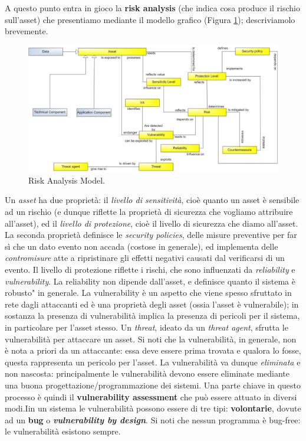 A questo punto entra in gioco la \textbf{risk analysis} (che indica cosa produce il rischio sull'asset) che presentiamo mediante il modello grafico (Figura \ref{img:risk_analysis_model}); descriviamolo brevemente. 
\begin{figure}[htbp]
	\centering
	\includegraphics[scale = 0.4]{images/risk_analysis_model}
	\caption{Risk Analysis Model.}
	\label{img:risk_analysis_model}
\end{figure}

Un \textit{asset} ha due proprietà: il \textit{livello di sensitività}, cioè quanto un asset è sensibile ad un rischio (e dunque riflette la proprietà di sicurezza che vogliamo attribuire all'asset), ed il \textit{livello di protezione}, cioè il livello di sicurezza che diamo all'asset. La seconda proprietà definisce le \textit{security policies}, delle misure preventive per far sì che un dato evento non accada (costose in generale), ed implementa delle \textit{contromisure} atte a ripristinare gli effetti negativi causati dal verificarsi di un evento. Il livello di protezione riflette i rischi, che sono influenzati da \textit{reliability} e \textit{vulnerability}. La reliability non dipende dall'asset, e definisce quanto il sistema è \textquotedleft robusto" in generale. La vulnerability è un aspetto che viene spesso sfruttato in rete dagli attaccanti ed è una proprietà degli asset (ossia l'asset è vulnerabile); in sostanza la presenza di vulnerabilità implica la presenza di pericoli per il sistema, in particolare per l'asset stesso. Un \textit{threat}, ideato da un \textit{threat agent}, sfrutta le vulnerabilità per attaccare un asset.  Si noti che la vulnerabilità, in generale, non è nota a priori da un attaccante: essa deve essere prima trovata e qualora lo fosse, questa rappresenta un pericolo per l'asset. La vulnerabilità va dunque \textit{eliminata} e non nascosta: principalmente le vulnerabilità devono essere eliminate mediante una buona progettazione/programmazione dei sistemi. Una parte chiave in questo processo è quindi il \textbf{vulnerability assessment} che può essere attuato in diversi modi.Iin un sistema le vulnerabilità possono essere di tre tipi: \textbf{volontarie}, dovute ad un \textbf{bug} o \textbf{\textit{vulnerability by design}}. Si noti che nessun programma è bug-free: le vulnerabilità esistono sempre.\\

